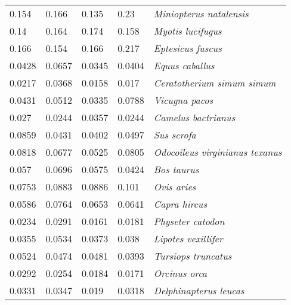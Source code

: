 \begin{tabular}{lllll}
          0.154 &           0.166 &           0.135 &           0.23 &               \textit{Miniopterus natalensis} \\
           0.14 &           0.164 &           0.174 &          0.158 &                     \textit{Myotis lucifugus} \\
          0.166 &           0.154 &           0.166 &          0.217 &                     \textit{Eptesicus fuscus} \\
         0.0428 &          0.0657 &          0.0345 &         0.0404 &                       \textit{Equus caballus} \\
         0.0217 &          0.0368 &          0.0158 &          0.017 &            \textit{Ceratotherium simum simum} \\
         0.0431 &          0.0512 &          0.0335 &         0.0788 &                        \textit{Vicugna pacos} \\
          0.027 &          0.0244 &          0.0357 &         0.0244 &                   \textit{Camelus bactrianus} \\
         0.0859 &          0.0431 &          0.0402 &         0.0497 &                           \textit{Sus scrofa} \\
         0.0818 &          0.0677 &          0.0525 &         0.0805 &       \textit{Odocoileus virginianus texanus} \\
          0.057 &          0.0696 &          0.0575 &         0.0424 &                           \textit{Bos taurus} \\
         0.0753 &          0.0883 &          0.0886 &          0.101 &                           \textit{Ovis aries} \\
         0.0586 &          0.0764 &          0.0653 &         0.0641 &                         \textit{Capra hircus} \\
         0.0234 &          0.0291 &          0.0161 &         0.0181 &                     \textit{Physeter catodon} \\
         0.0355 &          0.0534 &          0.0373 &          0.038 &                   \textit{Lipotes vexillifer} \\
         0.0524 &          0.0474 &          0.0481 &         0.0393 &                   \textit{Tursiops truncatus} \\
         0.0292 &          0.0254 &          0.0184 &         0.0171 &                         \textit{Orcinus orca} \\
         0.0331 &          0.0347 &           0.019 &         0.0318 &                \textit{Delphinapterus leucas} \\

\end{tabular}

